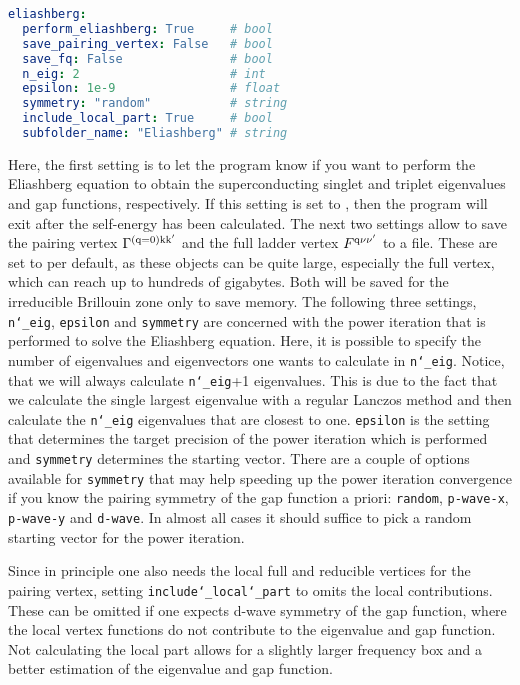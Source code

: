 \documentclass[../../main.tex]{subfiles}
\begin{document}
\begin{minipage}{\textwidth}%
\begin{lstlisting}[language=yaml]
eliashberg:
  perform_eliashberg: True     # bool
  save_pairing_vertex: False   # bool
  save_fq: False               # bool
  n_eig: 2                     # int
  epsilon: 1e-9                # float
  symmetry: "random"           # string  
  include_local_part: True     # bool
  subfolder_name: "Eliashberg" # string
\end{lstlisting}
\end{minipage}
Here, the first setting is to let the program know if you want to perform the Eliashberg equation to obtain the superconducting singlet and triplet eigenvalues and gap functions, respectively. If this setting is set to , then the program will exit after the self-energy has been calculated. The next two settings allow to save the pairing vertex $\Gamma^{(\text{q}=0)\text{k}\text{k}'}$ and the full ladder vertex $F^{\text{q}\nu\nu'}$ to a file. These are set to  per default, as these objects can be quite large, especially the full vertex, which can reach up to hundreds of gigabytes. Both will be saved for the irreducible Brillouin zone only to save memory. The following three settings, \texttt{n\char`_eig}, \texttt{epsilon} and \texttt{symmetry} are concerned with the power iteration that is performed to solve the Eliashberg equation. Here, it is possible to specify the number of eigenvalues and eigenvectors one wants to calculate in \texttt{n\char`_eig}. Notice, that we will always calculate \texttt{n\char`_eig}+1 eigenvalues. This is due to the fact that we calculate the single largest eigenvalue with a regular Lanczos method and then calculate the \texttt{n\char`_eig} eigenvalues that are closest to one. \texttt{epsilon} is the setting that determines the target precision of the power iteration which is performed and \texttt{symmetry} determines the starting vector. There are a couple of options available for \texttt{symmetry} that may help speeding up the power iteration convergence if you know the pairing symmetry of the gap function a priori: \texttt{random}, \texttt{p-wave-x}, \texttt{p-wave-y} and \texttt{d-wave}. In almost all cases it should suffice to pick a random starting vector for the power iteration. 

Since in principle one also needs the local full and reducible vertices for the pairing vertex, setting \texttt{include\char`_local\char`_part} to  omits the local contributions. These can be omitted if one expects d-wave symmetry of the gap function, where the local vertex functions do not contribute to the eigenvalue and gap function. Not calculating the local part allows for a slightly larger frequency box and a better estimation of the eigenvalue and gap function. 
\end{document}
